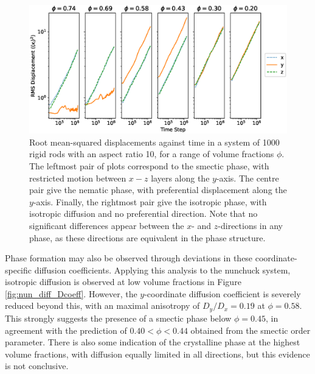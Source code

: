 \documentclass[11pt, a4paper]{article} %
\begin{document}
\begin{figure} [h!]
	\centering
	\includegraphics[width=\linewidth]{Figures/nun_diff_rmsplots}
	\caption{Root mean-squared displacements against time in a system of 1000 rigid rods with an aspect ratio 10, for a range of volume fractions $\phi$. The leftmost pair of plots correspond to the smectic phase, with restricted motion between $x-z$ layers along the $y$-axis. The centre pair give the nematic phase, with preferential displacement along the $y$-axis. Finally, the rightmost pair give the isotropic phase, with isotropic diffusion and no preferential direction. Note that no significant differences appear between the $x$- and $z$-directions in any phase, as these directions are equivalent in the phase structure.}
	\label{fig:nun_diff_rmsplots}
\end{figure}  %
Phase formation may also be observed through deviations in these coordinate-specific diffusion coefficients. Applying this analysis to the nunchuck system, isotropic diffusion is observed at low volume fractions in Figure \ref{fig:nun_diff_Dcoeff}. However, the $y$-coordinate diffusion coefficient is severely reduced beyond this, with an maximal anisotropy of $D_{y}/D_{x} = 0.19$ at $\phi = 0.58$. This strongly suggests the presence of a smectic phase below $\phi = 0.45$, in agreement with the prediction of $ 0.40<\phi<0.44$ obtained from the smectic order parameter. There is also some indication of the crystalline phase at the highest volume fractions, with diffusion equally limited in all directions, but this evidence is not conclusive.
\end{document}
